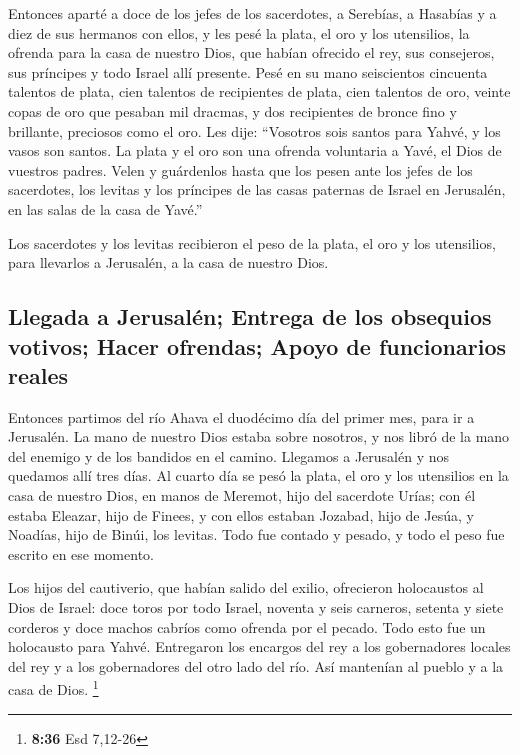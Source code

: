  Entonces aparté a doce de los jefes de los sacerdotes, a
Serebías, a Hasabías y a diez de sus hermanos con ellos, 
y les pesé la plata, el oro y los utensilios, la ofrenda para la casa de
nuestro Dios, que habían ofrecido el rey, sus consejeros, sus príncipes
y todo Israel allí presente.  Pesé en su mano seiscientos
cincuenta talentos de plata, cien talentos de recipientes de plata, cien
talentos de oro,  veinte copas de oro que pesaban mil
dracmas, y dos recipientes de bronce fino y brillante, preciosos como el
oro.  Les dije: ``Vosotros sois santos para Yahvé, y los
vasos son santos. La plata y el oro son una ofrenda voluntaria a Yavé,
el Dios de vuestros padres.  Velen y guárdenlos hasta que
los pesen ante los jefes de los sacerdotes, los levitas y los príncipes
de las casas paternas de Israel en Jerusalén, en las salas de la casa de
Yavé.''

 Los sacerdotes y los levitas recibieron el peso de la
plata, el oro y los utensilios, para llevarlos a Jerusalén, a la casa de
nuestro Dios.

\hypertarget{llegada-a-jerusaluxe9n-entrega-de-los-obsequios-votivos-hacer-ofrendas-apoyo-de-funcionarios-reales}{%
\subsection{Llegada a Jerusalén; Entrega de los obsequios votivos; Hacer
ofrendas; Apoyo de funcionarios
reales}\label{llegada-a-jerusaluxe9n-entrega-de-los-obsequios-votivos-hacer-ofrendas-apoyo-de-funcionarios-reales}}

 Entonces partimos del río Ahava el duodécimo día del
primer mes, para ir a Jerusalén. La mano de nuestro Dios estaba sobre
nosotros, y nos libró de la mano del enemigo y de los bandidos en el
camino.  Llegamos a Jerusalén y nos quedamos allí tres
días.  Al cuarto día se pesó la plata, el oro y los
utensilios en la casa de nuestro Dios, en manos de Meremot, hijo del
sacerdote Urías; con él estaba Eleazar, hijo de Finees, y con ellos
estaban Jozabad, hijo de Jesúa, y Noadías, hijo de Binúi, los levitas.
 Todo fue contado y pesado, y todo el peso fue escrito en
ese momento.

 Los hijos del cautiverio, que habían salido del exilio,
ofrecieron holocaustos al Dios de Israel: doce toros por todo Israel,
noventa y seis carneros, setenta y siete corderos y doce machos cabríos
como ofrenda por el pecado. Todo esto fue un holocausto para Yahvé.
 Entregaron los encargos del rey a los gobernadores
locales del rey y a los gobernadores del otro lado del río. Así
mantenían al pueblo y a la casa de Dios. \footnote{\textbf{8:36} Esd
  7,12-26}

